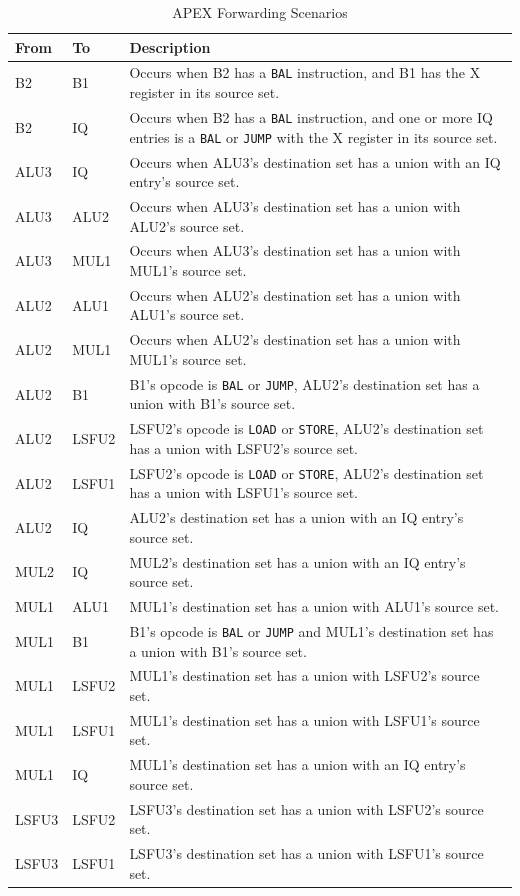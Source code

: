 \documentclass[12pt]{article}
\begin{document}
\begin{table}
  \centering
  \caption{APEX Forwarding Scenarios}
  \label{tab:fwdscenarios}
  \begin{tabular}{l|l|p{5.0in}}
    From & To & Description\\
    \hline
    B2 & B1 & Occurs when B2 has a \texttt{BAL} instruction, and B1 has the X register in its source set. \\
    B2 & IQ & Occurs when B2 has a \texttt{BAL} instruction, and one or more IQ entries is a \texttt{BAL} or \texttt{JUMP} with the X register in its source set. \\
    \hline
    ALU3 & IQ & Occurs when ALU3's destination set has a union with an IQ entry's source set. \\
    ALU3 & ALU2 & Occurs when ALU3's destination set has a union with ALU2's source set. \\
    ALU3 & MUL1 & Occurs when ALU3's destination set has a union with MUL1's source set. \\
    \hline
    ALU2 & ALU1 & Occurs when ALU2's destination set has a union with ALU1's source set.\\
    ALU2 & MUL1 & Occurs when ALU2's destination set has a union with MUL1's source set.\\
    ALU2 & B1 & B1's opcode is \texttt{BAL} or \texttt{JUMP}, ALU2's destination set has a union with B1's source set. \\
    ALU2 & LSFU2 & LSFU2's opcode is \texttt{LOAD} or \texttt{STORE}, ALU2's destination set has a union with LSFU2's source set. \\
    ALU2 & LSFU1 & LSFU2's opcode is \texttt{LOAD} or \texttt{STORE}, ALU2's destination set has a union with LSFU1's source set. \\
    ALU2 & IQ & ALU2's destination set has a union with an IQ entry's source set. \\
    \hline
    MUL2 & IQ & MUL2's destination set has a union with an IQ entry's source set. \\
    \hline
    MUL1 & ALU1 & MUL1's destination set has a union with ALU1's source set. \\
    MUL1 & B1 & B1's opcode is \texttt{BAL} or \texttt{JUMP} and MUL1's destination set has a union with B1's source set. \\
    MUL1 & LSFU2 & MUL1's destination set has a union with LSFU2's source set. \\
    MUL1 & LSFU1 & MUL1's destination set has a union with LSFU1's source set. \\
    MUL1 & IQ & MUL1's destination set has a union with an IQ entry's source set. \\
    \hline
    LSFU3 & LSFU2 & LSFU3's destination set has a union with LSFU2's source set. \\
    LSFU3 & LSFU1 & LSFU3's destination set has a union with LSFU1's source set. \\
    
    
  \end{tabular}
\end{table}
\end{document}
